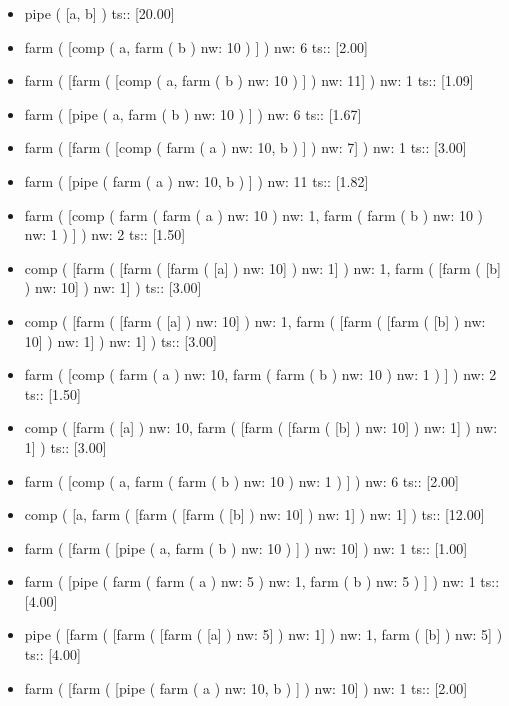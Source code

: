 \documentclass[12pt]{report}
\begin{document}
{\begin{itemize}
\item pipe  ( [a, b] )  ts::  [20.00] 
\item farm  ( [comp ( a, farm  ( b )  nw: 10 ) ] )  nw: 6 ts::  [2.00] 
\item farm  ( [farm  ( [comp ( a, farm  ( b )  nw: 10 ) ] )  nw: 11] )  nw: 1 ts::  [1.09] 
\item farm  ( [pipe ( a, farm  ( b )  nw: 10 ) ] )  nw: 6 ts::  [1.67] 
\item farm  ( [farm  ( [comp ( farm  ( a )  nw: 10, b ) ] )  nw: 7] )  nw: 1 ts::  [3.00] 
\item farm  ( [pipe ( farm  ( a )  nw: 10, b ) ] )  nw: 11 ts::  [1.82] 
\item farm  ( [comp ( farm  ( farm  ( a )  nw: 10 )  nw: 1, farm  ( farm  ( b )  nw: 10 )  nw: 1 ) ] )  nw: 2 ts::  [1.50] 
\item comp  ( [farm  ( [farm  ( [farm  ( [a] )  nw: 10] )  nw: 1] )  nw: 1, farm  ( [farm  ( [b] )  nw: 10] )  nw: 1] )  ts::  [3.00] 
\item comp  ( [farm  ( [farm  ( [a] )  nw: 10] )  nw: 1, farm  ( [farm  ( [farm  ( [b] )  nw: 10] )  nw: 1] )  nw: 1] )  ts::  [3.00] 
\item farm  ( [comp ( farm  ( a )  nw: 10, farm  ( farm  ( b )  nw: 10 )  nw: 1 ) ] )  nw: 2 ts::  [1.50] 
\item comp  ( [farm  ( [a] )  nw: 10, farm  ( [farm  ( [farm  ( [b] )  nw: 10] )  nw: 1] )  nw: 1] )  ts::  [3.00] 
\item farm  ( [comp ( a, farm  ( farm  ( b )  nw: 10 )  nw: 1 ) ] )  nw: 6 ts::  [2.00] 
\item comp  ( [a, farm  ( [farm  ( [farm  ( [b] )  nw: 10] )  nw: 1] )  nw: 1] )  ts::  [12.00] 
\item farm  ( [farm  ( [pipe ( a, farm  ( b )  nw: 10 ) ] )  nw: 10] )  nw: 1 ts::  [1.00] 
\item farm  ( [pipe ( farm  ( farm  ( a )  nw: 5 )  nw: 1, farm  ( b )  nw: 5 ) ] )  nw: 1 ts::  [4.00] 
\item pipe  ( [farm  ( [farm  ( [farm  ( [a] )  nw: 5] )  nw: 1] )  nw: 1, farm  ( [b] )  nw: 5] )  ts::  [4.00] 
\item farm  ( [farm  ( [pipe ( farm  ( a )  nw: 10, b ) ] )  nw: 10] )  nw: 1 ts::  [2.00] 
\end{itemize}}
\end{document}
